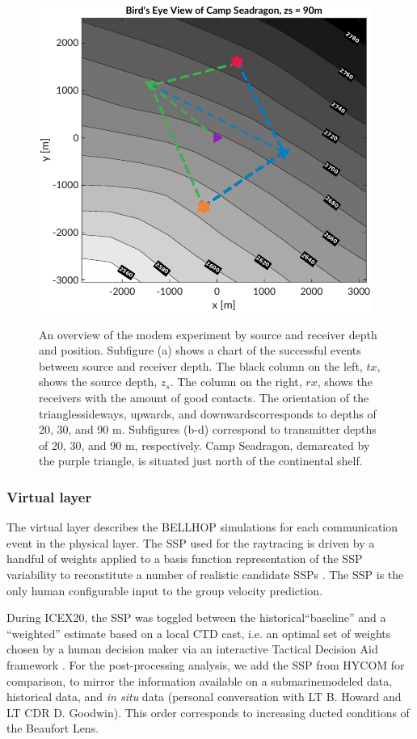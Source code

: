 \begin{figure}[h!]
  \includegraphics[width=.48\textwidth]{figs/Fig3d.pdf} \\
  \caption{An overview of the modem experiment by source and receiver depth and position. Subfigure (a) shows a chart of the successful events between source and receiver depth. The black column on the left, $tx$, shows the source depth, $z_s$. The column on the right, $rx$, shows the receivers with the amount of good contacts. The orientation of the triangles\textemdash sideways, upwards, and downwards\textemdash corresponds to depths of 20, 30, and 90 m. Subfigures (b-d) correspond to transmitter depths of 20, 30, and 90 m, respectively. Camp Seadragon, demarcated by the purple triangle, is situated just north of the continental shelf.}
  \label{fig:overview}
  \end{figure}

\clearpage

\subsubsection{Virtual layer}
The virtual layer describes the BELLHOP simulations for each communication event in the physical layer.
The SSP used for the raytracing is driven by a handful of weights applied to a basis function representation
of the SSP variability to reconstitute a number of realistic candidate SSPs \citep{leblanc_underwater_1980,lin_merging_2010}.
The SSP is the only human configurable input to the group velocity prediction.

During ICEX20, the SSP was toggled between the historical``baseline'' and a ``weighted'' estimate based on a local CTD cast, i.e. an optimal set of weights chosen by a human decision maker via an interactive Tactical Decision Aid framework \citep{bhatt_embedded_2021}.
For the post-processing analysis, we add the SSP from HYCOM for comparison, to mirror the information available on a submarine\textemdash modeled data, historical data, and \textit{in situ} data (personal conversation with LT B. Howard and LT CDR D. Goodwin).
This order corresponds to increasing ducted conditions of the Beaufort Lens.

